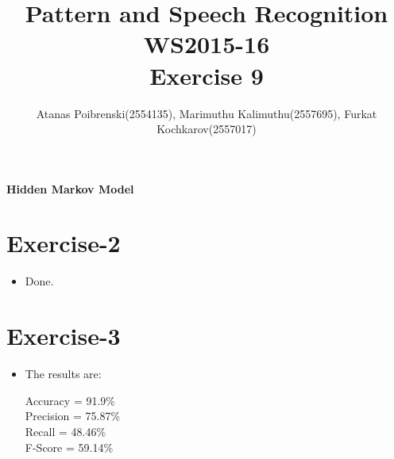 \documentclass[a4paper]{article}
\title{Pattern and Speech Recognition WS2015-16 \\ Exercise 9}
\author{Atanas Poibrenski(2554135), Marimuthu Kalimuthu(2557695), Furkat Kochkarov(2557017)}
\begin{document}

\maketitle 
\begin{center}
	\textbf{Hidden Markov Model}
\end{center}

\section*{Exercise-2}
\begin{itemize}
	\item Done.
\end{itemize}

\section*{Exercise-3}
	\begin{itemize}
		\item The results are:
		
			\begin{tcolorbox}
				Accuracy = 91.9\% \\
				Precision = 75.87\% \\
				Recall = 48.46\% \\
				F-Score = 59.14\% \\
			\end{tcolorbox}						    
	\end{itemize}
\end{document}
